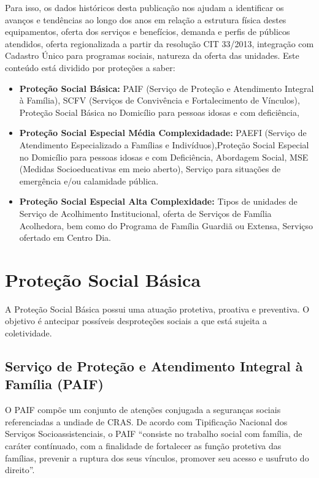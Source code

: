 \documentclass[
  brazilian]{report}
\begin{document}
Para isso, os dados históricos desta publicação nos ajudam a identificar
os avanços e tendências ao longo dos anos em relação a estrutura física
destes equipamentos, oferta dos serviços e benefícios, demanda e perfis
de públicos atendidos, oferta regionalizada a partir da resolução CIT
33/2013, integração com Cadastro Único para programas sociais, natureza
da oferta das unidades. Este conteúdo está dividido por proteções a
saber:

\begin{itemize}
\item
  \textbf{Proteção Social Básica:} PAIF (Serviço de Proteção e
  Atendimento Integral à Família), SCFV (Serviços de Convivência e
  Fortalecimento de Vínculos), Proteção Social Básica no Domicílio para
  pessoas idosas e com deficiência,
\item
  \textbf{Proteção Social Especial Média Complexidadade:} PAEFI (Serviço
  de Atendimento Especializado a Famílias e Indivíduos),Proteção Social
  Especial no Domicílio para pessoas idosas e com Deficiência, Abordagem
  Social, MSE (Medidas Socioeducativas em meio aberto), Serviço para
  situações de emergência e/ou calamidade pública.
\item
  \textbf{Proteção Social Especial Alta Complexidade:} Tipos de unidades
  de Serviço de Acolhimento Institucional, oferta de Serviços de Família
  Acolhedora, bem como do Programa de Família Guardiã ou Extensa,
  Serviçso ofertado em Centro Dia.
\end{itemize}

\hypertarget{proteuxe7uxe3o-social-buxe1sica}{%
\section{Proteção Social Básica}\label{proteuxe7uxe3o-social-buxe1sica}}

A Proteção Social Básica possui uma atuação protetiva, proativa e
preventiva. O objetivo é antecipar possíveis desproteções sociais a que
está sujeita a coletividade.

\hypertarget{serviuxe7o-de-proteuxe7uxe3o-e-atendimento-integral-uxe0-famuxedlia-paif}{%
\subsection{Serviço de Proteção e Atendimento Integral à Família
(PAIF)}\label{serviuxe7o-de-proteuxe7uxe3o-e-atendimento-integral-uxe0-famuxedlia-paif}}

O PAIF compõe um conjunto de atenções conjugada a seguranças sociais
referenciadas a undiade de CRAS. De acordo com Tipificação Nacional dos
Serviços Socioassistenciais, o PAIF ``consiste no trabalho social com
família, de caráter contínuado, com a finalidade de fortalecer as função
protetiva das famílias, prevenir a ruptura dos seus vínculos, promover
seu acesso e usufruto do direito''.
\end{document}
